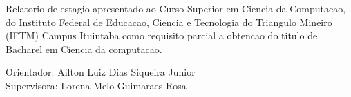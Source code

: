 \documentclass[12pt, a4paper]{article}
\begin{document}
\hfill %
\begin{minipage}{8cm}
\begin{singlespace}
Relatorio de estagio apresentado ao Curso Superior em Ciencia da Computacao,
do Instituto Federal de Educacao, Ciencia e Tecnologia do Triangulo Mineiro
(IFTM) Campus Ituiutaba como requisito parcial a obtencao do titulo de
Bacharel em Ciencia da computacao.
\end{singlespace}

Orientador: Ailton Luiz Dias Siqueira Junior\\
Supervisora: Lorena Melo Guimaraes Rosa
\end{minipage}
\end{document}
